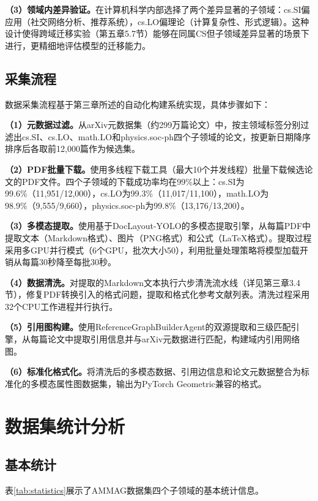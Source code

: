 \textbf{（3）领域内差异验证。}在计算机科学内部选择了两个差异显著的子领域：cs.SI偏应用（社交网络分析、推荐系统），cs.LO偏理论（计算复杂性、形式逻辑）。这种设计使得跨域迁移实验（第五章5.7节）能够在同属CS但子领域差异显著的场景下进行，更精细地评估模型的迁移能力。

\subsection{采集流程}

数据采集流程基于第三章所述的自动化构建系统实现，具体步骤如下：

\textbf{（1）元数据过滤。}从arXiv元数据集（约299万篇论文）中，按主领域标签分别过滤出cs.SI、cs.LO、math.LO和physics.soc-ph四个子领域的论文，按更新日期降序排序后各取前12,000篇作为候选集。

\textbf{（2）PDF批量下载。}使用多线程下载工具（最大10个并发线程）批量下载候选论文的PDF文件。四个子领域的下载成功率均在99\%以上：cs.SI为99.6\%（11,951/12,000），cs.LO为99.3\%（11,017/11,100），math.LO为98.9\%（9,555/9,660），physics.soc-ph为99.8\%（13,176/13,200）。

\textbf{（3）多模态提取。}使用基于DocLayout-YOLO\cite{zhao2024doclayoutyolo}的多模态提取引擎，从每篇PDF中提取文本（Markdown格式）、图片（PNG格式）和公式（LaTeX格式）。提取过程采用多GPU并行模式（6个GPU，批次大小50），利用批量处理策略将模型加载开销从每篇30秒降至每批30秒。

\textbf{（4）数据清洗。}对提取的Markdown文本执行六步清洗流水线（详见第三章3.4节），修复PDF转换引入的格式问题，提取和格式化参考文献列表。清洗过程采用32个CPU工作进程并行执行。

\textbf{（5）引用图构建。}使用ReferenceGraphBuilderAgent的双源提取和三级匹配引擎，从每篇论文中提取引用信息并与arXiv元数据进行匹配，构建域内引用网络图。

\textbf{（6）标准化格式化。}将清洗后的多模态数据、引用边信息和论文元数据整合为标准化的多模态属性图数据集，输出为PyTorch Geometric兼容的格式。

\section{数据集统计分析}

\subsection{基本统计}

表\ref{tab:statistics}展示了AMMAG数据集四个子领域的基本统计信息。

